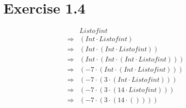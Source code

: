 \section*{Exercise 1.4}

\begin{align*}
    & Listofint \\
    \Rightarrow & (Int \cdot Listofint) \\
    \Rightarrow & (Int \cdot (Int \cdot Listofint)) \\
    \Rightarrow & (Int \cdot (Int \cdot (Int \cdot Listofint))) \\
    \Rightarrow & ( -7 \cdot (Int \cdot (Int \cdot Listofint))) \\
    \Rightarrow & ( -7 \cdot (  3 \cdot (Int \cdot Listofint))) \\
    \Rightarrow & ( -7 \cdot (  3 \cdot ( 14 \cdot Listofint))) \\
    \Rightarrow & ( -7 \cdot (  3 \cdot ( 14 \cdot         ())))
\end{align*}
